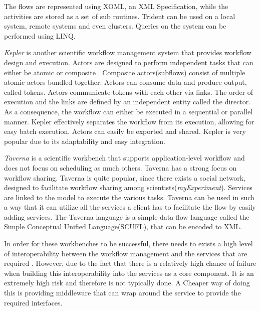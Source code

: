 \documentclass[11pt,twocolumn]{article}
\begin{document}
    The flows are represented using XOML, an XML Specification, while
    the activities are stored as a set of sub routines\cite{Simmhan2011790}. Trident
    can be used on a local system, remote systems and even clusters.
    Queries on the system can be performed using LINQ.


    \emph{Kepler} is another scientific workflow
    management system that provides workflow design and execution.
    Actors are designed to perform independent tasks that can either
    be atomic or  composite  \cite{Wang:2009:KHG:1645164.1645176}.
    Composite actors(subflows) consist
    of multiple   atomic actors bundled together. Actors can consume data and
    produce output, called tokens. Actors communicate tokens with
    each other via links. The order of execution and the links are
    defined by an independent entity called the director. As a
    consequence, the workflow can either be executed in a
    sequential or parallel manner. Kepler effectively separates
    the workflow from its execution, allowing for easy batch
    execution. Actors can easily be exported and shared.
    Kepler is very popular due to its adaptability and easy
    integration.

    \emph{Taverna} is a scientific workbench that supports
    application-level workflow and does not focus on scheduling
    as much others\cite{4721191}. Taverna has a strong focus on workflow
    sharing. Taverna is quite popular, since there exists
    a social network, designed to facilitate workflow sharing
    among scientists(\emph{myExperiment}). Services are linked to the model to
    execute the various tasks. Taverna can be used in such
    a way that it can utilize all the services a client has
    to facilitate the flow by easily adding services. The
    Taverna language is a simple data-flow language called
    the Simple Conceptual Unified Language(SCUFL), that can
    be encoded to XML.

    In order for these workbenches to be successful, there needs
    to exists a high level of interoperability between the
    workflow management and the services that are required
    \cite{Shegalov:2001:XWM:767132.767139}.
    However, due to the fact that there is a relatively high
    chance of failure when building this interoperability into the
    services as a core component. It is an extremely high risk
    and therefore is not typically done. A Cheaper way of
    doing this is providing middleware that can wrap around
    the service to provide the required interfaces.
\end{document}
